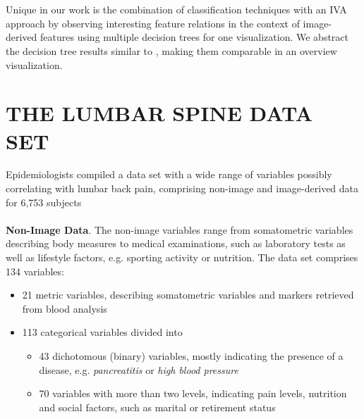\documentclass[a4paper,twoside]{style/article}
\begin{document}
\\\\
Unique in our work is the combination of classification techniques with an IVA approach by observing interesting feature relations in the context of image-derived features using multiple decision trees for one visualization.
We abstract the decision tree results similar to \cite{Turkay}, making them comparable in an overview visualization.
\section{\uppercase{The Lumbar Spine Data Set}}
\label{sec:MaterialsAndMethod}
\noindent Epidemiologists compiled a data set with a wide range of variables possibly correlating with lumbar back pain, comprising non-image and image-derived data for 6,753 subjects
\\\\
\noindent \textbf{Non-Image Data}.
The non-image variables range from somatometric variables describing body measures to medical examinations, such as laboratory tests as well as lifestyle factors, e.g. sporting activity or nutrition.
The data set comprises 134 variables: %
\begin{itemize}
	\item 21 metric variables, describing somatometric variables and markers retrieved from blood analysis
	\item 113 categorical variables divided into
	\begin{itemize}
		\item 43 dichotomous (binary) variables, mostly indicating the presence of a disease, e.g. \emph{pancreatitis} or \emph{high blood pressure}
		\item 70 variables with more than two levels, indicating pain levels, nutrition and social factors, such as marital or retirement status
	\end{itemize}
\end{itemize}
\end{document}
